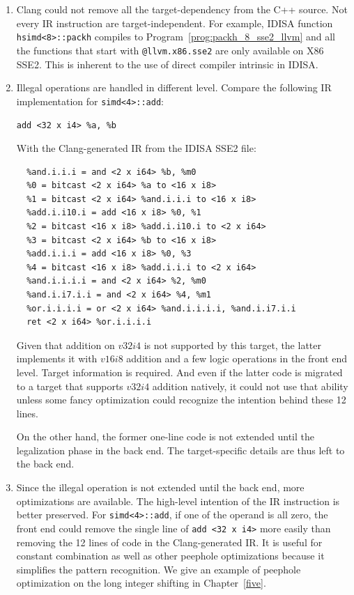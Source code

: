 \begin{enumerate}
    \item Clang could not remove all the target-dependency from the C++ source. Not every IR instruction are target-independent. For example, IDISA function {\tt hsimd<8>::packh} compiles to Program~\ref{prog:packh_8_sse2_llvm} and all the functions that start with {\tt @llvm.x86.sse2} are only available on X86 SSE2. This is inherent to the use of direct compiler intrinsic in IDISA.
    \newpage

    \item Illegal operations are handled in different level. Compare the following IR implementation for {\tt simd<4>::add}:
      \begin{center}
        \verb|add <32 x i4> %a, %b|
      \end{center}
    With the Clang-generated IR from the IDISA SSE2 file:
      \begin{center}
        \begin{verbatim}
  %and.i.i.i = and <2 x i64> %b, %m0
  %0 = bitcast <2 x i64> %a to <16 x i8>
  %1 = bitcast <2 x i64> %and.i.i.i to <16 x i8>
  %add.i.i10.i = add <16 x i8> %0, %1
  %2 = bitcast <16 x i8> %add.i.i10.i to <2 x i64>
  %3 = bitcast <2 x i64> %b to <16 x i8>
  %add.i.i.i = add <16 x i8> %0, %3
  %4 = bitcast <16 x i8> %add.i.i.i to <2 x i64>
  %and.i.i.i.i = and <2 x i64> %2, %m0
  %and.i.i7.i.i = and <2 x i64> %4, %m1
  %or.i.i.i.i = or <2 x i64> %and.i.i.i.i, %and.i.i7.i.i
  ret <2 x i64> %or.i.i.i.i
        \end{verbatim}
      \end{center}

    Given that addition on $v32i4$ is not supported by this target, the latter implements it with $v16i8$ addition and a few logic operations in the front end level. Target information is required. And even if the latter code is migrated to a target that supports $v32i4$ addition natively, it could not use that ability unless some fancy optimization could recognize the intention behind these 12 lines.

    On the other hand, the former one-line code is not extended until the legalization phase in the back end. The target-specific details are thus left to the back end.

    \item Since the illegal operation is not extended until the back end, more optimizations are available. The high-level intention of the IR instruction is better preserved. For {\tt simd<4>::add}, if one of the operand is all zero, the front end could remove the single line of \verb|add <32 x i4>| more easily than removing the 12 lines of code in the Clang-generated IR\@. It is useful for constant combination as well as other peephole optimizations because it simplifies the pattern recognition. We give an example of peephole optimization on the long integer shifting in Chapter~\ref{five}.
\end{enumerate}


